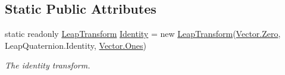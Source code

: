 \subsection*{Static Public Attributes}
\begin{DoxyCompactItemize}
\item 
static readonly \mbox{\hyperlink{struct_leap_1_1_leap_transform}{Leap\+Transform}} \mbox{\hyperlink{struct_leap_1_1_leap_transform_a10de68df5cf1afa89c273a33d0629f16}{Identity}} = new \mbox{\hyperlink{struct_leap_1_1_leap_transform}{Leap\+Transform}}(\mbox{\hyperlink{struct_leap_1_1_vector_a007c4ee68aa890118b7a2d24aa4d9a6b}{Vector.\+Zero}}, Leap\+Quaternion.\+Identity, \mbox{\hyperlink{struct_leap_1_1_vector_a0eb4303bb2650290ac5ca18f1e59563d}{Vector.\+Ones}})
\begin{DoxyCompactList}\small\item\em The identity transform. \end{DoxyCompactList}\end{DoxyCompactItemize}
